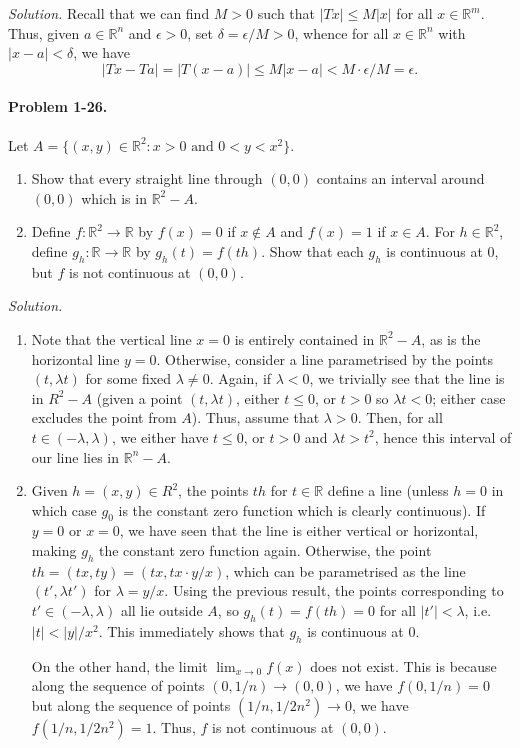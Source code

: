 \documentclass[11pt]{report}
\newcommand{\R}{\mathbb{R}}
\newcommand{\problem}[1]{\paragraph{Problem #1.}}
\newcommand{\solution}{\noindent\textit{Solution.} }
\begin{document}
    \solution Recall that we can find $M > 0$ such that $|Tx| \leq M|x|$ for all $x
    \in \R^m$. Thus, given $a \in \R^n$ and $\epsilon > 0$, set $\delta = \epsilon /
    M > 0$, whence for all $x \in \R^n$ with $|x - a| < \delta$, we have \[
        |Tx - Ta| = |T(x - a)| \leq M|x - a| < M\cdot \epsilon / M = \epsilon.
    \] 


    \problem{1-26} Let $A = \{(x, y) \in \R^2: x > 0 \text{ and } 0 < y < x^2\}$.
    \begin{enumerate}
        \item Show that every straight line through $(0, 0)$ contains an interval
        around $(0, 0)$ which is in $\R^2 - A$.

        \item Define $f\colon \R^2 \to \R$ by $f(x) = 0$ if $x \notin A$ and $f(x) =
        1$ if $x \in A$. For $h \in \R^2$, define $g_h\colon \R \to \R$ by $g_h(t) =
        f(th)$. Show that each $g_h$ is continuous at $0$, but $f$ is not continuous
        at $(0, 0)$.
    \end{enumerate}

    \solution \begin{enumerate}
        \item Note that the vertical line $x = 0$ is entirely contained in $\R^2 -
        A$, as is the horizontal line $y = 0$. Otherwise, consider a line
        parametrised by the points $(t, \lambda t)$ for some fixed $\lambda \neq 0$.
        Again, if $\lambda < 0$, we trivially see that the line is in $R^2 - A$
        (given a point $(t, \lambda t)$, either $t \leq 0$, or $t > 0$ so $\lambda t
        < 0$; either case excludes the point from $A$). Thus, assume that $\lambda >
        0$. Then, for all $t \in (- \lambda, \lambda)$, we either have $t \leq 0$, or
        $t > 0$ and $\lambda t > t^2$, hence this interval of our line lies in $\R^n
        - A$.

        \item Given $h = (x, y) \in R^2$, the points $th$ for $t \in \R$ define a line
        (unless $h = 0$ in which case $g_0$ is the constant zero function which is
        clearly continuous). If $y = 0$ or $x = 0$, we have seen that the line is
        either vertical or horizontal, making $g_h$ the constant zero function again.
        Otherwise, the point $th = (tx, ty) = (tx, tx \cdot y / x)$, which can be
        parametrised as the line $(t', \lambda t')$ for $\lambda = y / x$. Using the
        previous result, the points corresponding to $t' \in (-\lambda, \lambda)$ all
        lie outside $A$, so $g_h(t) = f(th) = 0$ for all $|t'| < \lambda$, i.e.\ $|t| <
        |y| / x^2$. This immediately shows that $g_h$ is continuous at 0.

        On the other hand, the limit $\lim_{x \to 0} f(x)$ does not exist. This is
        because along the sequence of points $(0, 1 / n) \to (0, 0)$, we have $f(0, 1
        / n) = 0$ but along the sequence of points $(1 / n, 1 / 2n^2) \to 0$, we have
        $f(1 / n, 1 / 2n^2) = 1$. Thus, $f$ is not continuous at $(0, 0)$.
    \end{enumerate}
\end{document}
